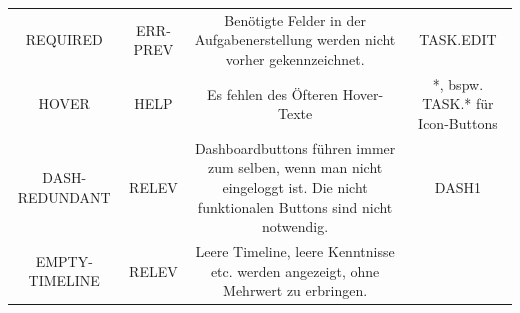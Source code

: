 \documentclass[
  12pt,
  ngerman,
  a4paper,
]{article}
\begin{document}
\begin{longtable}[]{@{}cccc@{}}
\begin{minipage}[t]{0.11\columnwidth}
REQUIRED\strut
\end{minipage} & \begin{minipage}[t]{0.13\columnwidth}\centering
ERR-PREV\strut
\end{minipage} & \begin{minipage}[t]{0.33\columnwidth}\centering
Benötigte Felder in der Aufgabenerstellung werden nicht vorher
gekennzeichnet.\strut
\end{minipage} & \begin{minipage}[t]{0.32\columnwidth}\centering
TASK.EDIT\strut
\end{minipage}\tabularnewline
\begin{minipage}[t]{0.11\columnwidth}\centering
HOVER\strut
\end{minipage} & \begin{minipage}[t]{0.13\columnwidth}\centering
HELP\strut
\end{minipage} & \begin{minipage}[t]{0.33\columnwidth}\centering
Es fehlen des Öfteren Hover-Texte\strut
\end{minipage} & \begin{minipage}[t]{0.32\columnwidth}\centering
*, bspw. TASK.* für Icon-Buttons\strut
\end{minipage}\tabularnewline
\begin{minipage}[t]{0.11\columnwidth}\centering
DASH-REDUNDANT\strut
\end{minipage} & \begin{minipage}[t]{0.13\columnwidth}\centering
RELEV\strut
\end{minipage} & \begin{minipage}[t]{0.33\columnwidth}\centering
Dashboardbuttons führen immer zum selben, wenn man nicht eingeloggt ist.
Die nicht funktionalen Buttons sind nicht notwendig.\strut
\end{minipage} & \begin{minipage}[t]{0.32\columnwidth}\centering
DASH1\strut
\end{minipage}\tabularnewline
\begin{minipage}[t]{0.11\columnwidth}\centering
EMPTY-TIMELINE\strut
\end{minipage} & \begin{minipage}[t]{0.13\columnwidth}\centering
RELEV\strut
\end{minipage} & \begin{minipage}[t]{0.33\columnwidth}\centering
Leere Timeline, leere Kenntnisse etc. werden angezeigt, ohne Mehrwert zu
erbringen.\strut

\end{minipage}
\end{longtable}
\end{document}
